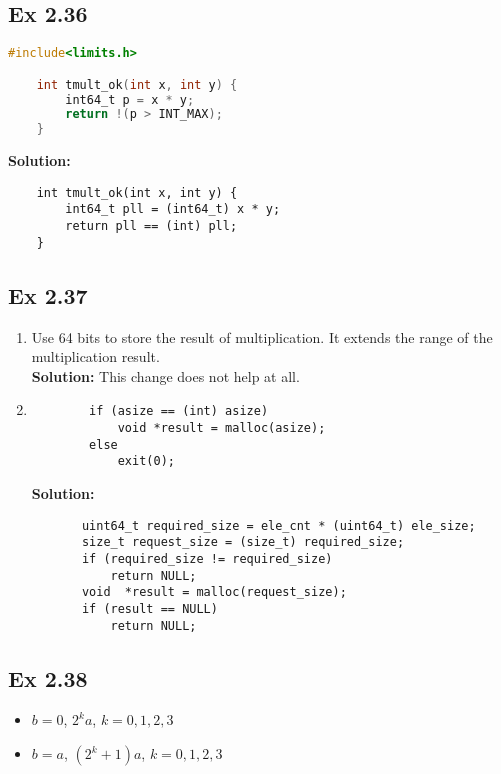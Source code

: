 \subsection{Ex 2.36}
\begin{lstlisting}[language=C]
    #include<limits.h>

    int tmult_ok(int x, int y) {
        int64_t p = x * y;
        return !(p > INT_MAX);
    }
\end{lstlisting}
{\color{red}\textbf{Solution: }
\begin{lstlisting}
    int tmult_ok(int x, int y) {
        int64_t pll = (int64_t) x * y;
        return pll == (int) pll;
    }
\end{lstlisting}
}

\subsection{Ex 2.37}
\begin{enumerate}
    \item Use 64 bits to store the result of multiplication. It extends the range of the multiplication result.\\
    {\color{red}\textbf{Solution: }This change does not help at all.}
    \item 
    \begin{lstlisting}
        if (asize == (int) asize)
            void *result = malloc(asize);
        else
            exit(0);
    \end{lstlisting}
   {\color{blue}\textbf{Solution: }
   \begin{lstlisting}
       uint64_t required_size = ele_cnt * (uint64_t) ele_size;
       size_t request_size = (size_t) required_size;
       if (required_size != required_size)
           return NULL;
       void  *result = malloc(request_size);
       if (result == NULL)
           return NULL;
   \end{lstlisting}
   } 
\end{enumerate}

\subsection{Ex 2.38}
\begin{itemize}
    \item $b = 0$, $2^k a$, $k = 0, 1, 2, 3$
    \item $b = a$, $(2^k + 1)a$, $k = 0, 1, 2, 3$
\end{itemize}

